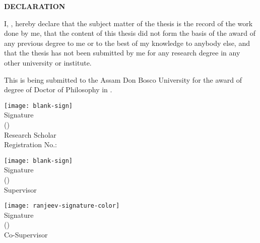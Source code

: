 \begin{titlepage}
    \begin{center}
        {\bf \LARGE DECLARATION}
    \end{center}

    \par
    I, \textit{\authorname}, hereby declare that the subject matter of the thesis is the record of the work done by me, that the content of this thesis did not form the basis of the award of any previous degree to me or to the best of my knowledge to anybody else, and that the thesis has not been submitted by me for any research degree in any other university or institute.
    
    \par
    This is being submitted to the Assam Don Bosco University for the award of degree of Doctor of Philosophy in \department.
    
    \vspace*{10mm}
    \begin{flushleft}
    	\texttt{[image: blank-sign]}\vspace{-3mm}\\
        Signature\\
        (\authorname)\\
        Research Scholar\\
        Registration No.: \textit{\registrationNo}
    \end{flushleft}
    
    \vspace*{5mm}
    \begin{minipage}{0.7\textwidth}
    	\texttt{[image: blank-sign]}\vspace{-3mm}\\
    	Signature\\
		(\supervisor)\\
		Supervisor
    \end{minipage}
    \begin{minipage}{0.7\textwidth}
    	\texttt{[image: ranjeev-signature-color]}\vspace{-3mm}\\
		Signature\\
		(\cosupervisor)\\
		Co-Supervisor
    \end{minipage}
    
%    
    

\end{titlepage}

